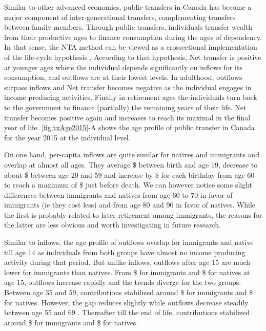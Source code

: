 Similar to other advanced economies, public transfers in Canada has become a major component of inter-generational transfers, complementing transfers between family members.
Through public transfers, individuals transfer wealth from their productive ages to finance consumption during the ages of dependency.
In that sense, the NTA method can be viewed as a crossectional implementation of the life-cycle hypothesis \citep{Ando:1963ea,Deaton:2005vr}.
According to that hypothesis, Net transfer is positive at younger ages where the individual depends significantly on inflows for its consumption, and outflows are at their lowest levels.
In adulthood, outflows surpass inflows and Net transfer becomes negative as the individual engages in income producing activities.
Finally in retirement ages the individuals turn back to the government to finance (partially) the remaining years of their life.
Net transfer becomes positive again and increases to reach its maximal in the final year of life. \autoref{fig:txAge2015}-A shows the age profile of public transfer in Canada for the year 2015 at the individual level.

\vspace{0.7em}\par
On one hand, per-capita inflows are quite similar for natives and immigrants and overlap at almost all ages.
They average \$ between birth and age 19, decrease to about \$ between age 20 and 59 and increase by \$ for each birthday from age 60 to reach a maximum of \$ just before death.
We can however notice some slight differences between immigrants and natives from age 60 to 70 in favor of immigrants (ie they cost less) and from age 80 and 90 in favor of natives.
While the first is probably related to later retirement among immigrants, the reasons for the latter are less obvious and worth investigating in future research.

\vspace{0.7em}\par
Similar to inflows, the age profile of outflows overlap for immigrants and native till age 14 as individuals from both groups have almost no income producing activity during that period.
But unlike inflows, outflows after age 15 are much lower for immigrants than natives.
From \$ for immigrants and \$ for natives at age 15, outflows increase rapidly and the trends diverge for the two groups.
Between age 35 and 59, contributions stabilized around \$ for immigrants and \$ for natives.
However, the gap reduces slightly while outflows decrease steadily between age 55 and 69 .
Thereafter till the end of life, contributions stabilized around \$ for immigrants and \$ for natives.

